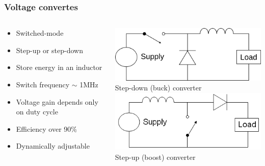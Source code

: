 \documentclass{beamer}
\begin{document}
\begin{frame}
  \frametitle{Voltage convertes}

\begin{columns}
 \begin{column}{.5\textwidth}
 \begin{itemize}
  \item Switched-mode
  \item Step-up or step-down
  \item Store energy in an inductor
  \item Switch frequency $\sim$ 1MHz
  \item Voltage gain depends only on duty cycle
  \item Efficiency over 90\%
  \item Dynamically adjustable
 \end{itemize}
\end{column}

\begin{column}{.45\textwidth}
\begin{center}
 \includegraphics[width=\textwidth]{./Slike/Buck} \\
  Step-down (buck) converter \\
 \includegraphics[width=\textwidth]{./Slike/Boost} \\
  Step-up (boost) converter
\end{center}
\end{column}

\end{columns}

\end{frame}
\end{document}
